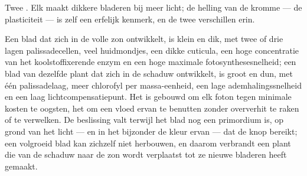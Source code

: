 \begin{omfigure}

{\small Twee . Elk  maakt dikkere bladeren bij meer
licht; de helling van de kromme --- de plasticiteit --- is zelf een erfelijk
kenmerk, en de twee  verschillen erin.}
\end{omfigure}

\begin{proposition}\label{prop:b2:plant-plasticity:sunshade}
Een blad dat zich in de volle zon ontwikkelt, is klein en dik, met twee of
drie lagen palissadecellen, veel huidmondjes, een dikke cuticula, een hoge
concentratie van het koolstoffixerende enzym en een hoge maximale
fotosynthesesnelheid; een blad van dezelfde plant dat zich in de schaduw
ontwikkelt, is groot en dun, met één palissadelaag, meer chlorofyl per
massa-eenheid, een lage ademhalingssnelheid en een laag
lichtcompensatiepunt. Het  is gebouwd om elk foton tegen minimale
kosten te oogsten, het  om een vloed ervan te benutten zonder
oververhit te raken of te verwelken. De beslissing valt terwijl het blad nog
een primordium is, op grond van het licht --- en in het bijzonder de kleur
ervan --- dat de knop bereikt; een volgroeid blad kan zichzelf niet
herbouwen, en daarom verbrandt een plant die van de schaduw naar de zon
wordt verplaatst tot ze nieuwe bladeren heeft gemaakt.
\end{proposition}

